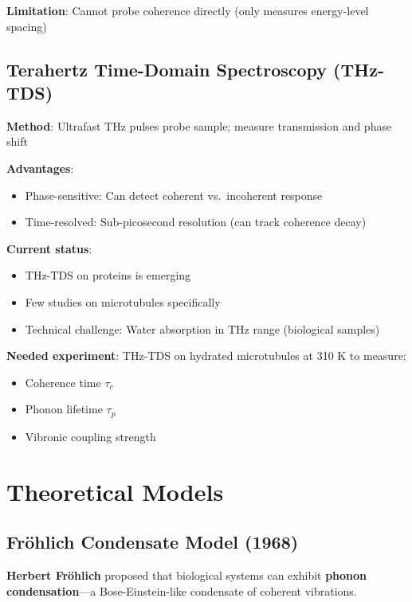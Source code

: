 \textbf{Limitation}: Cannot probe coherence directly (only measures
energy-level spacing)

\subsection{Terahertz Time-Domain Spectroscopy (THz-TDS)}\label{terahertz-time-domain-spectroscopy-thz-tds-emerging}

\textbf{Method}: Ultrafast THz pulses probe sample; measure transmission
and phase shift

\textbf{Advantages}:
\begin{itemize}
\item Phase-sensitive: Can detect coherent vs.~incoherent response
\item Time-resolved: Sub-picosecond resolution (can track coherence decay)
\end{itemize}

\textbf{Current status}:
\begin{itemize}
\item THz-TDS on proteins is emerging
\item Few studies on microtubules specifically
\item Technical challenge: Water absorption in THz range (biological samples)
\end{itemize}

\textbf{Needed experiment}: THz-TDS on hydrated microtubules at 310 K to measure:
\begin{itemize}
\item Coherence time $\tau_c$
\item Phonon lifetime $\tau_p$
\item Vibronic coupling strength
\end{itemize}



\section{Theoretical Models}\label{theoretical-models}

\subsection{Fröhlich Condensate Model (1968)}\label{fruxf6hlich-condensate-model-1968}

\textbf{Herbert Fröhlich} proposed that biological systems can exhibit
\textbf{phonon condensation}---a Bose-Einstein-like condensate of
coherent vibrations.

